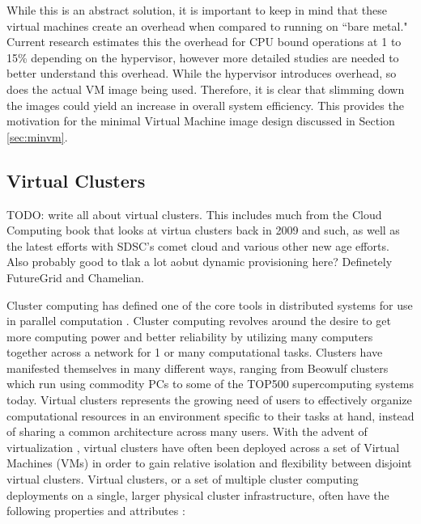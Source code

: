While this is an abstract solution, it is important to keep in mind that these virtual machines create an overhead when compared to running on ``bare metal."  Current research estimates this the overhead for CPU bound operations at 1 to 15\% depending on the hypervisor, however more detailed studies are needed to better understand this overhead.   While the hypervisor introduces overhead, so does the actual VM image being used.  Therefore, it is clear that slimming down the images could yield an increase in overall system efficiency.  This provides the motivation for the minimal Virtual Machine image design discussed in Section \ref{sec:minvm}.

\subsection{Virtual Clusters}

TODO: write all about virtual clusters. This includes much from the Cloud Computing book that looks at virtua clusters back in 2009 and such, as well as the latest efforts with SDSC's comet cloud and various other new age efforts. Also probably good to tlak a lot aobut dynamic provisioning here? Definetely FutureGrid and Chamelian. 

Cluster computing has defined one of the core tools in distributed systems for use in parallel computation \cite{amdahl1967validity}. Cluster computing revolves around the desire to get more computing power and better reliability by utilizing many computers together across a network for 1 or many computational tasks. Clusters have manifested themselves in many different ways, ranging from Beowulf clusters \cite{becker1995beowulf} which run using commodity PCs to some of the TOP500 \cite{www-top500} supercomputing systems today.  Virtual clusters represents the growing need of users to effectively organize computational resources in an environment specific to their tasks at hand, instead of sharing a common architecture across many users. With the advent of virtualization \cite{barham2003xen}, virtual clusters have often been deployed across a set of Virtual Machines (VMs) in order to gain relative isolation and flexibility between disjoint virtual clusters. Virtual clusters, or a set of multiple cluster computing deployments on a single, larger physical cluster infrastructure, often have the following properties and attributes \cite{hwang2013distributed}:


